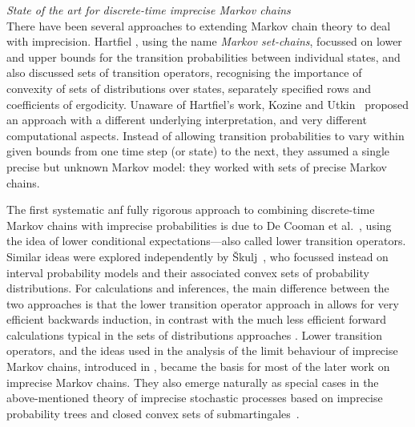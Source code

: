 \documentclass[11pt,dvipsnames,usenames,a4paper]{article}
\begin{document}
\emph{State of the art for discrete-time imprecise Markov chains}\\[5pt]
There have been several approaches to extending Markov chain theory to deal with imprecision. 
Hartfiel \cite{hartfiel1998}, using the name \emph{Markov set-chains}, focussed on lower and upper bounds for the transition probabilities between individual states, and also discussed sets of transition operators, recognising the importance of convexity of sets of distributions over states, separately specified rows and coefficients of ergodicity. 
Unaware of Hartfiel's work, Kozine and Utkin~\cite{utkin:02} proposed an approach with a different underlying interpretation, and very different computational aspects. 
Instead of allowing transition probabilities to vary within given bounds from one time step (or state) to the next, they assumed a single precise but unknown Markov model: they worked with sets of precise Markov chains. 

The first systematic anf fully rigorous approach to combining discrete-time Markov chains with imprecise probabilities is due to De Cooman et al.~\cite{cooman2008}, using the idea of lower conditional expectations---also called lower transition operators. 
Similar ideas were explored independently by Škulj~\cite{skulj:09}, who focussed instead on interval probability models and their associated convex sets of probability distributions. 
For calculations and inferences, the main difference between the two approaches is that the lower transition operator approach in \cite{cooman2008} allows for very efficient backwards induction, in contrast with the much less efficient forward calculations typical in the sets of distributions approaches \cite{skulj:09}. 
Lower transition operators, and the ideas used in the analysis of the limit behaviour of imprecise Markov chains, introduced in \cite{cooman2008}, became the basis for most of the later work on imprecise Markov chains. 
They also emerge naturally as special cases in the above-mentioned theory of imprecise stochastic processes based on imprecise probability trees and closed convex sets of submartingales~\cite{cooman2015:markovergodic}.
\end{document}
